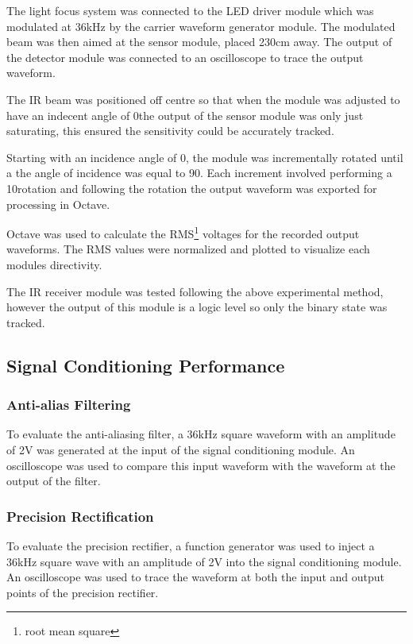 The light focus system was connected to the LED driver module which was modulated at 36kHz by the carrier waveform generator module. The modulated beam was then aimed at the sensor module, placed 230cm away. The output of the detector module was connected to an oscilloscope to trace the output waveform.

The IR beam was positioned off centre so that when the module was adjusted to have an indecent angle of 0\textdegree the output of the sensor module was only just saturating, this ensured the sensitivity could be accurately tracked. %

Starting with an incidence angle of 0\textdegree, the module was incrementally rotated until a the angle of incidence was equal to 90\textdegree. Each increment involved performing a 10\textdegree rotation and following the rotation the output waveform was exported for processing in Octave.

Octave was used to calculate the RMS\footnote{root mean square} voltages for the recorded output waveforms. The RMS values were normalized and plotted to visualize each modules directivity.

The IR receiver module was tested following the above experimental method, however the output of this module is a logic level so only the binary state was tracked.






\subsection{Signal Conditioning Performance}

\subsubsection{Anti-alias Filtering}
To evaluate the anti-aliasing filter, a 36kHz square waveform with an amplitude of 2V was generated at the input of the signal conditioning module. An oscilloscope was used to compare this input waveform with the waveform at the output of the filter.

\subsubsection{Precision Rectification}
To evaluate the precision rectifier, a function generator was used to inject a 36kHz square wave with an amplitude of 2V into the signal conditioning module. An oscilloscope was used to trace the waveform at both the input and output points of the precision rectifier.



